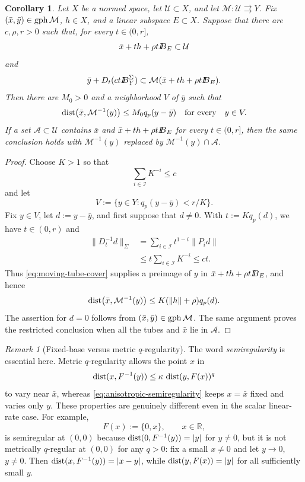 \documentclass[11pt]{amsart}
\newtheorem{corollary}[theorem]{Corollary}
\theoremstyle{definition}
\theoremstyle{remark}
\newtheorem{remark}[theorem]{Remark}
\newcommand{\tto}{\rightrightarrows}
\newcommand{\bx}{\bar x}
\newcommand{\by}{\bar y}
\newcommand{\gph}{\mathop{\rm gph}\nolimits}
\newcommand{\dist}{\mathop{\rm dist}\nolimits}
\def\ball{{I\kern -.35em B}}
\begin{document}
	\begin{corollary}
		\label{cor:moving-tube-inverse}
		Let $X$ be a normed space, let $\mathcal U\subset X$, and let
		$\mathcal M:\mathcal U\tto Y$. Fix
		$(\bx,\by)\in\gph\mathcal M$, $h\in X$, and a linear subspace $E\subset X$.
		Suppose that there are $c,\rho,r>0$ such that, for every $t\in(0,r]$,
		$$
		\bx+th+\rho t\ball_E\subset\mathcal U
		$$
		and
		\begin{equation}
			\by+D_t(ct\ball_Y^\Sigma)
			\subset\mathcal M(\bx+th+\rho t\ball_E).
			\label{eq:moving-tube-cover}
		\end{equation}
		Then there are $M_0>0$ and a neighborhood $V$ of $\by$ such that
		$$
		\dist\bigl(\bx,\mathcal M^{-1}(y)\bigr)
		\le M_0q_p(y-\by)
		\quad\text{for every}\quad y\in V.
		$$
		If a set $\mathcal A\subset\mathcal U$ contains $\bx$ and
		$\bx+th+\rho t\ball_E$ for every $t\in(0,r]$, then the same conclusion holds with
		$\mathcal M^{-1}(y)$ replaced by
		$\mathcal M^{-1}(y)\cap\mathcal A$.
	\end{corollary}
	
	\begin{proof}
		Choose $K>1$ so that
		$$
		\sum_{i\in\mathcal I}K^{-i}\le c
		$$
		and let
		$$
		V:=\{y\in Y:q_p(y-\by)<r/K\}.
		$$
		Fix $y\in V$, let $d:=y-\by$, and first suppose that $d\ne0$. With
		$t:=Kq_p(d)$, we have $t\in(0,r)$ and
		$$
		\begin{aligned}
			\|D_t^{-1}d\|_\Sigma
			&=\sum_{i\in\mathcal I}t^{1-i}\|P_i d\|\\
			&\le t\sum_{i\in\mathcal I}K^{-i}
			\le ct.
		\end{aligned}
		$$
		Thus \eqref{eq:moving-tube-cover} supplies a preimage of $y$ in
		$\bx+th+\rho t\ball_E$, and hence
		$$
		\dist\bigl(\bx,\mathcal M^{-1}(y)\bigr)
		\le K(\|h\|+\rho)q_p(d).
		$$
		The assertion for $d=0$ follows from $(\bx,\by)\in\gph\mathcal M$.
		The same argument proves the restricted conclusion when all the tubes and
		$\bx$ lie in $\mathcal A$.
	\end{proof}
	
	\begin{remark}[Fixed-base versus metric $q$-regularity]
		The word \emph{semiregularity} is essential here. Metric $q$-regularity
		allows the point $x$ in
		$$
		\dist(x,F^{-1}(y))
		\le\kappa\,\dist(y,F(x))^q
		$$
		to vary near $\bx$, whereas \eqref{eq:anisotropic-semiregularity} keeps
		$x=\bx$ fixed and varies only $y$. These properties are genuinely
		different even in the scalar linear-rate case. For example,
		$$
		F(x):=\{0,x\},\qquad x\in\mathbb R,
		$$
		is semiregular at $(0,0)$ because
		$\dist(0,F^{-1}(y))=|y|$ for $y\ne0$, but it is not metrically
		$q$-regular at $(0,0)$ for any $q>0$: fix a small $x\ne0$ and let
		$y\to0$, $y\ne0$. Then
		$\dist(x,F^{-1}(y))=|x-y|$, while
		$\dist(y,F(x))=|y|$ for all sufficiently small $y$.
	\end{remark}
	
\end{document}
